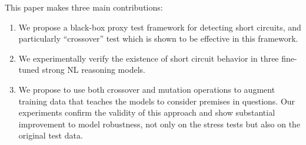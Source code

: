 This paper makes three main contributions:
\begin{enumerate}
\item We propose a black-box proxy test framework for detecting short circuits, and 
particularly ``crossover'' test which is shown to be effective in this framework.
\item We experimentally verify the existence of short circuit behavior
in three fine-tuned strong NL reasoning models. 
\item We propose to use both crossover and mutation operations
to augment training data that teaches the models to consider 
premises in questions. Our experiments confirm the validity 
of this approach and show substantial improvement to model robustness,
not only on the stress tests but also on the original test data.
\end{enumerate}






